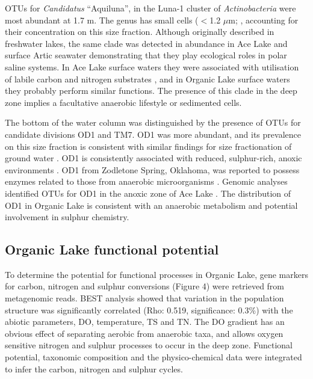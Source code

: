 \acp{OTU} for \emph{Candidatus} “Aquiluna”, in the Luna-1 cluster of \emph{Actinobacteria} \cite{Hahn2004, Hahn2009} were most abundant at 1.7 m. 
The genus has small cells ($<$1.2 $\mu$m; \cite{Hahn2009}, accounting for their concentration on this size fraction. 
Although originally described in freshwater lakes, the same clade was detected in abundance in Ace Lake \cite{Lauro2011} and surface Artic seawater \cite{Kang2012} demonstrating that they play ecological roles in polar saline systems. 
In Ace Lake surface waters they were associated with utilisation of labile carbon and nitrogen substrates \cite{Lauro2011}, and in Organic Lake surface waters they probably perform similar functions. 
The presence of this clade in the deep zone implies a facultative anaerobic lifestyle or sedimented cells. 

The bottom of the water column was distinguished by the presence of \acp{OTU} for candidate divisions OD1 and TM7. 
OD1 was more abundant, and its prevalence on this size fraction is consistent with similar findings for size fractionation of ground water \cite{Miyoshi2005}. 
OD1 is consistently associated with reduced, sulphur-rich, anoxic environments \cite{Harris2004, Elshahed2005}. 
OD1 from Zodletone Spring, Oklahoma, was reported to possess enzymes related to those from anaerobic microorganisms \cite{Elshahed2005}. 
Genomic analyses identified \acp{OTU} for OD1 in the anoxic zone of Ace Lake \cite{Lauro2011}. 
The distribution of OD1 in Organic Lake is consistent with an anaerobic metabolism and potential involvement in sulphur chemistry. 


\subsection{Organic Lake functional potential}
To determine the potential for functional processes in Organic Lake, gene markers for carbon, nitrogen and sulphur conversions (Figure 4) were retrieved from metagenomic reads. 
BEST analysis showed that variation in the population structure was significantly correlated (Rho: 0.519, significance: 0.3\%) with the abiotic parameters, \ac{DO}, temperature, \ac{TS} and \ac{TN}. 
The \ac{DO} gradient has an obvious effect of separating aerobic from anaerobic taxa, and allows oxygen sensitive nitrogen and sulphur processes to occur in the deep zone. 
Functional potential, taxonomic composition and the physico-chemical data were integrated to infer the carbon, nitrogen and sulphur cycles.


